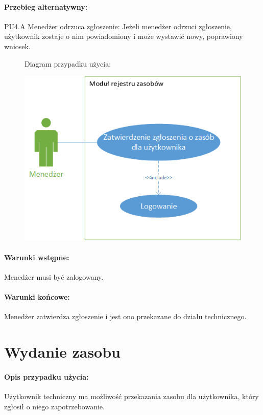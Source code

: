 \documentclass[11pt, a4paper, oneside]{report}
\begin{document}
\paragraph{Przebieg alternatywny:}
PU4.A Menedżer odrzuca zgłoszenie: Jeżeli menedżer odrzuci zgłoszenie, użytkownik zostaje o nim powiadomiony i może wystawić nowy, poprawiony wniosek.

\begin{figure}[H]
Diagram przypadku użycia:

\centering
\includegraphics[scale=1]{menedzer_zasoby.png}
\end{figure}

\paragraph{Warunki wstępne:} Menedżer musi być zalogowany.
\paragraph{Warunki końcowe:} Menedżer zatwierdza zgłoszenie i jest ono przekazane do działu technicznego.

\section{Wydanie zasobu}
\paragraph{Opis przypadku użycia:} 
Użytkownik techniczny ma możliwość przekazania zasobu dla użytkownika, który zgłosił o niego zapotrzebowanie.
\end{document}
